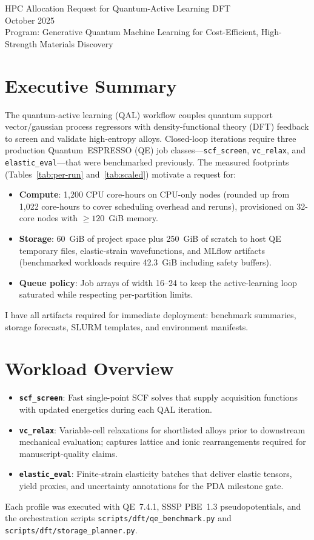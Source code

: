 \documentclass[11pt]{article}
\begin{document}
\begin{center}
{\LARGE HPC Allocation Request for Quantum-Active Learning DFT}\\[0.5em]
{\large October 2025}\\[0.5em]
{\normalsize Program: Generative Quantum Machine Learning for Cost-Efficient, High-Strength Materials Discovery}
\end{center}

\section*{Executive Summary}
The quantum-active learning (QAL) workflow couples quantum support vector/gau\-ssian process regressors with density-functional theory (DFT) feedback to screen and validate high-entropy alloys. Closed-loop iterations require three production Quantum~ESPRESSO (QE) job classes---\texttt{scf\_screen}, \texttt{vc\_relax}, and \texttt{elastic\_eval}---that were benchmarked previously. The measured footprints (Tables~\ref{tab:per-run} and~\ref{tab:scaled}) motivate a request for:
\begin{itemize}[leftmargin=1.5em]
  \item \textbf{Compute}: 1{,}200 CPU core-hours on CPU-only nodes (rounded up from 1{,}022 core-hours to cover scheduling overhead and reruns), provisioned on 32-core nodes with \(\geq 120\)~GiB memory.
  \item \textbf{Storage}: 60~GiB of project space plus 250~GiB of scratch to host QE temporary files, elastic-strain wavefunctions, and MLflow artifacts (benchmarked workloads require 42.3~GiB including safety buffers).
  \item \textbf{Queue policy}: Job arrays of width 16--24 to keep the active-learning loop saturated while respecting per-partition limits.
\end{itemize}
I have all artifacts required for immediate deployment: benchmark summaries, storage forecasts, SLURM templates, and environment manifests.

\section*{Workload Overview}
\begin{itemize}[leftmargin=1.5em]
  \item \textbf{\texttt{scf\_screen}}: Fast single-point SCF solves that supply acquisition functions with updated energetics during each QAL iteration.
  \item \textbf{\texttt{vc\_relax}}: Variable-cell relaxations for shortlisted alloys prior to downstream mechanical evaluation; captures lattice and ionic rearrangements required for manuscript-quality claims.
  \item \textbf{\texttt{elastic\_eval}}: Finite-strain elasticity batches that deliver elastic tensors, yield proxies, and uncertainty annotations for the PDA milestone gate.
\end{itemize}
Each profile was executed with QE~7.4.1, SSSP PBE~1.3 pseudopotentials, and the orchestration scripts \texttt{scripts/dft/qe\_benchmark.py} and \texttt{scripts/dft/storage\_planner.py}.
\end{document}
